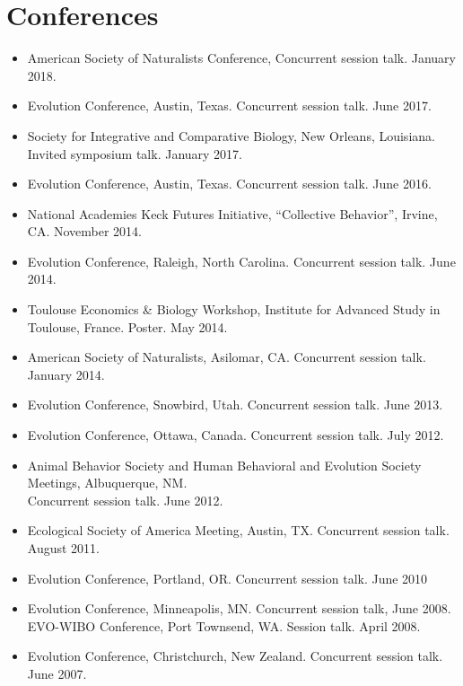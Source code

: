 \documentclass[11pt]{article}
\begin{document}
  \section{Conferences}

  \begin{itemize}
  \item American Society of Naturalists Conference, Concurrent session talk. January 2018.
  \item Evolution Conference, Austin, Texas. Concurrent session talk. June 2017.
  \item Society for Integrative and Comparative Biology, New Orleans, Louisiana. Invited symposium talk. January 2017.
  \item Evolution Conference, Austin, Texas. Concurrent session talk. June 2016.
  \item National Academies Keck Futures Initiative, ``Collective Behavior'', Irvine, CA. November 2014.
  \item Evolution Conference, Raleigh, North Carolina. Concurrent session talk. June 2014.
  \item Toulouse Economics \& Biology Workshop, Institute for Advanced Study in Toulouse, France. Poster. May 2014.
  \item American Society of Naturalists, Asilomar, CA. Concurrent session talk. January 2014.
  \item Evolution Conference, Snowbird, Utah. Concurrent session talk. June 2013.
  \item Evolution Conference, Ottawa, Canada. Concurrent session talk. July 2012.
  \item Animal Behavior Society and Human Behavioral and Evolution Society Meetings, Albuquerque, NM.  \\
    Concurrent session talk.  June 2012.
  \item %
    Ecological Society of America Meeting, Austin, TX. Concurrent session talk. August 2011.
  \item %
    Evolution Conference, Portland, OR. Concurrent session talk. June 2010
  \item %
    Evolution Conference, Minneapolis, MN. Concurrent session talk, June 2008. \\
    EVO-WIBO Conference, Port Townsend, WA. Session talk. April 2008. 
  \item %
    Evolution Conference, Christchurch, New Zealand. Concurrent session talk. June 2007. 
  \end{itemize}
\end{document}

